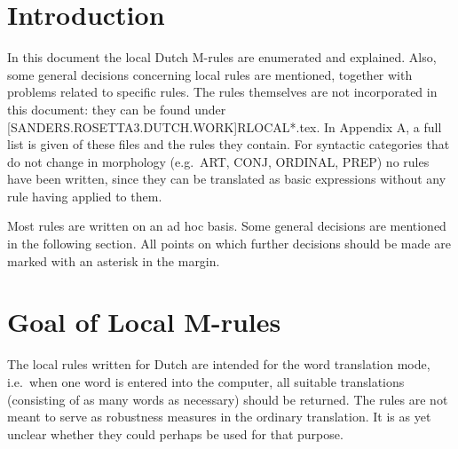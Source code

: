 

   \RosDate{\today}
   \RosSupersedes{-}
   \MakeRosTitle
%
\newpage
\section{Introduction}
In this document the local Dutch M-rules are enumerated and explained. Also, 
some general decisions  concerning local rules are mentioned, together with 
problems related to specific rules. The rules themselves are not incorporated in 
this document: they can be found under 
[SANDERS.ROSETTA3.DUTCH.WORK]RLOCAL*.tex.
In Appendix A, a full list is given of these files and the rules they contain.
For syntactic categories that do not change in morphology (e.g.\ ART, CONJ, 
ORDINAL, PREP) no rules have been written, since they can be translated as 
basic expressions without any rule having applied to them.

Most rules are written on an ad hoc basis. Some general decisions are mentioned 
in the following section. All points on which further decisions should be made 
are marked with an asterisk in the margin.

\section{Goal of Local M-rules}
The local rules written for Dutch are intended for the word translation mode, 
i.e.\ when one word is entered into the computer, all suitable 
translations (consisting of as many words as necessary) should be returned. 
The rules are not meant to serve as
robustness measures in the ordinary translation. It is as yet unclear whether 
they could perhaps be used for that purpose.

